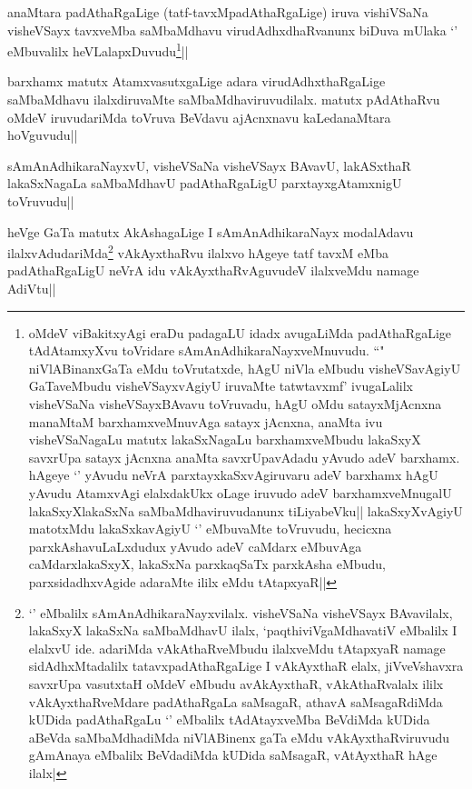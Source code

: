 
\begin{artha}
anaMtara padAthaRgaLige (tatf-tavxMpadAthaRgaLige) iruva vishiVSaNa visheVSayx tavxveMba saMbaMdhavu virudAdhxdhaRvanunx biDuva mUlaka `\stext ' eMbuvalilx heVLalapxDuvudu\footnote[1]{oMdeV viBakitxyAgi eraDu padagaLU idadx avugaLiMda padAthaRgaLige tAdAtamxyXvu toVridare sAmAnAdhikaraNayxveMnuvudu. ``\stext " niVlABinanxGaTa eMdu toVrutatxde, hAgU niVla eMbudu visheVSavAgiyU GaTaveMbudu visheVSayxvAgiyU iruvaMte tatwtavxmf' ivugaLalilx visheVSaNa visheVSayxBAvavu toVruvadu, hAgU oMdu satayxMjAcnxna manaMtaM barxhamxveMnuvAga satayx jAcnxna, anaMta ivu visheVSaNagaLu matutx lakaSxNagaLu barxhamxveMbudu lakaSxyX savxrUpa satayx jAcnxna anaMta savxrUpavAdadu yAvudo adeV barxhamx. hAgeye `\stext ' yAvudu neVrA parxtayxkaSxvAgiruvaru adeV barxhamx hAgU yAvudu AtamxvAgi elalxdakUkx oLage iruvudo adeV barxhamxveMnugalU lakaSxyXlakaSxNa saMbaMdhaviruvudanunx tiLiyabeVku|| lakaSxyXvAgiyU matotxMdu lakaSxkavAgiyU `\stext ' eMbuvaMte toVruvudu, hecicxna parxkAshavuLaLxdudux yAvudo adeV caMdarx eMbuvAga caMdarxlakaSxyX, lakaSxNa parxkaqSaTx parxkAsha eMbudu, parxsidadhxvAgide adaraMte ililx eMdu tAtapxyaR||}||
\end{artha}

\begin{artha}
barxhamx matutx AtamxvasutxgaLige adara virudAdhxthaRgaLige saMbaMdhavu ilalxdiruvaMte saMbaMdhaviruvudilalx. matutx pAdAthaRvu oMdeV iruvudariMda toVruva BeVdavu ajAcnxnavu kaLedanaMtara hoVguvudu||
\end{artha}


\begin{artha}
sAmAnAdhikaraNayxvU, visheVSaNa visheVSayx BAvavU, lakASxthaR lakaSxNagaLa saMbaMdhavU padAthaRgaLigU parxtayxgAtamxnigU toVruvudu||
\end{artha}


\begin{artha}
heVge GaTa matutx AkAshagaLige I sAmAnAdhikaraNayx modalAdavu ilalxvAdudariMda\footnote[1]{`\stext ' eMbalilx sAmAnAdhikaraNayxvilalx. visheVSaNa visheVSayx BAvavilalx, lakaSxyX lakaSxNa saMbaMdhavU ilalx, `paqthiviVgaMdhavatiV eMbalilx I elalxvU ide. adariMda vAkAthaRveMbudu ilalxveMdu tAtapxyaR namage sidAdhxMtadalilx tatavxpadAthaRgaLige I vAkAyxthaR elalx, jiVveVshavxra savxrUpa vasutxtaH oMdeV eMbudu avAkAyxthaR, vAkAthaRvalalx ililx vAkAyxthaRveMdare padAthaRgaLa saMsagaR, athavA saMsagaRdiMda kUDida padAthaRgaLu `\stext ' eMbalilx tAdAtayxveMba BeVdiMda kUDida aBeVda saMbaMdhadiMda niVlABinenx gaTa eMdu vAkAyxthaRviruvudu gAmAnaya eMbalilx BeVdadiMda kUDida saMsagaR, vAtAyxthaR hAge ilalx|} vAkAyxthaRvu ilalxvo hAgeye tatf tavxM eMba padAthaRgaLigU neVrA idu vAkAyxthaRvAguvudeV ilalxveMdu namage AdiVtu||
\end{artha}


